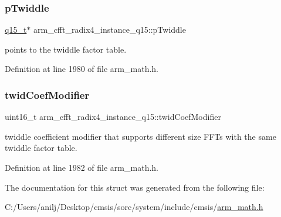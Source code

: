 \subsubsection{\texorpdfstring{p\+Twiddle}{pTwiddle}}
{\footnotesize\ttfamily \hyperlink{arm__math_8h_ab5a8fb21a5b3b983d5f54f31614052ea}{q15\+\_\+t}$\ast$ arm\+\_\+cfft\+\_\+radix4\+\_\+instance\+\_\+q15\+::p\+Twiddle}

points to the twiddle factor table. 

Definition at line 1980 of file arm\+\_\+math.\+h.

\mbox{\label{structarm__cfft__radix4__instance__q15_af32fdc78bcc27ca385f9b76a0a1f71c3}} 
\subsubsection{\texorpdfstring{twid\+Coef\+Modifier}{twidCoefModifier}}
{\footnotesize\ttfamily uint16\+\_\+t arm\+\_\+cfft\+\_\+radix4\+\_\+instance\+\_\+q15\+::twid\+Coef\+Modifier}

twiddle coefficient modifier that supports different size F\+F\+Ts with the same twiddle factor table. 

Definition at line 1982 of file arm\+\_\+math.\+h.



The documentation for this struct was generated from the following file\+:\begin{DoxyCompactItemize}
\item 
C\+:/\+Users/anilj/\+Desktop/cmsis/sorc/system/include/cmsis/\hyperlink{arm__math_8h}{arm\+\_\+math.\+h}\end{DoxyCompactItemize}
